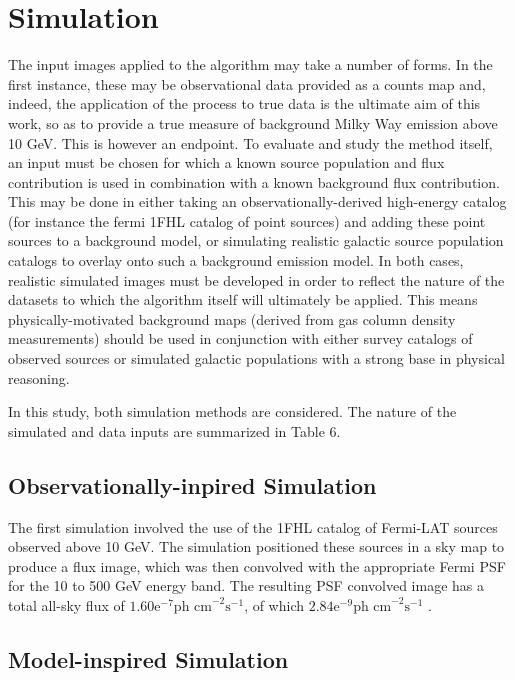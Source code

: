 \documentclass{PoS}
\begin{document}
\section{Simulation}


The input images applied to the algorithm may take a number of forms. In the first instance, these may be observational data provided as a counts map and, indeed, the application of the process to true data is the ultimate aim of this work, so as to provide a true measure of background Milky Way emission above 10 GeV. This is however an endpoint. To evaluate and study the method itself, an input must be chosen for which a known source population and flux contribution is used in combination with a known background flux contribution. This may be done in either taking an observationally-derived high-energy catalog (for instance the fermi 1FHL catalog of point sources) and adding these point sources to a background model, or simulating realistic galactic source population catalogs to overlay onto such a background emission model. In both cases, realistic simulated images must be developed in order to reflect the nature of the datasets to which the algorithm itself will ultimately be applied. This means physically-motivated background maps (derived from gas column density measurements) should be used in conjunction with either survey catalogs of observed sources or simulated galactic populations with a strong base in physical reasoning.


In this study, both simulation methods are considered. The nature of the simulated and data inputs are summarized in Table 6.


\subsection{Observationally-inpired Simulation}

The first simulation involved the use of the 1FHL catalog of Fermi-LAT sources observed above 10 GeV. The simulation positioned these sources in a sky map to produce a flux image, which was then convolved with the appropriate Fermi PSF for the 10 to 500 GeV energy band. The resulting PSF convolved image has a total all-sky flux of $1.60\text{e}^{-7} \text{ph cm}^{-2}\text{s}^{-1}$, of which $2.84\text{e}^{-9} \text{ph cm}^{-2}\text{s}^{-1}$ .

\subsection{Model-inspired Simulation}
\end{document}
